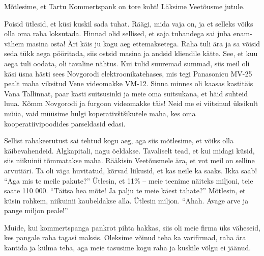 Mõtlesime, et Tartu Kommertspank on tore koht! Läksime 
Veetõusme jutule. 

Poisid ütlesid, et küsi kuskil sada tuhat. 
Räägi, mida vaja on, ja et selleks võiks olla oma raha 
loksutada. Hinnad olid sellised, et saja tuhandega sai juba 
enam-vähem masina osta! Äri käis ju kogu aeg ettemaksetega. Raha tuli ära 
ja sa võisid seda tükk aega pööritada, siis ostsid masina ja andsid kliendile 
kätte. See, et kuu aega tuli oodata, oli tavaline nähtus. Kui tulid suuremad 
summad, siis meil oli käsi üsna hästi sees Novgorodi elektroonikatehases, mis 
tegi Panasonicu MV-25 pealt maha viksitud Vene videomakke VM-12. Sinna minnes oli kaasas kastitäis Vana Tallinnat, 
paar kasti suitsusinki ja meie oma suitsukana, et häid suhteid luua. Kõmm Novgorodi ja furgoon
videomakke täis! Neid me ei viitsinud üksikult müüa, vaid müüsime hulgi 
koperativštšikutele maha, kes oma kooperatiivipoodides parseldasid edasi. 

Sellist rahakeerutust sai tehtud kogu aeg, aga siis mõtlesime, et võiks olla 
käibevahendeid. Algkapitali, nagu öeldakse. Tavaliselt tead, et kui midagi 
küsid, siis niikuinii tõmmatakse maha. Rääkisin 
Veetõusmele ära, et vot meil on selline arvutiäri. Ta oli 
väga huvitatud, kõrvad liikusid, et kas neile ka saaks. Ikka saab! \enquote{Aga 
mis te meile pakute?} Ütlesin, et 11\% -- meie teenime näiteks miljoni, teie 
saate 110 000. \enquote{Täitsa hea mõte! Ja palju te meie käest tahate?} 
Mõtlesin, et küsin rohkem, niikuinii kaubeldakse alla. Ütlesin miljon. 
\enquote{Ahah. Avage arve ja pange miljon peale!}

Muide, kui kommertspanga pankrot pihta 
hakkas, siis oli meie firma üks väheseid, kes pangale raha tagasi maksis. Oleksime 
võinud teha ka varifirmad, raha ära kantida ja külma 
teha, aga meie tasusime kogu raha ja kuskile võlgu ei jäänud.


